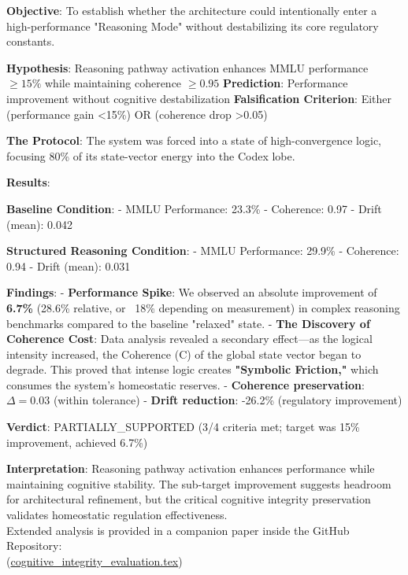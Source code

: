 \documentclass[12pt,a4paper]{report}
\newcommand{\geqU}{\geq}
\newcommand{\DeltaU}{\Delta}
\begin{document}
\textbf{Objective}: To establish whether the architecture could intentionally enter a high-performance "Reasoning Mode" without destabilizing its core regulatory constants.

\textbf{Hypothesis}: Reasoning pathway activation enhances MMLU performance $\geqU 15\%$ while maintaining coherence $\geqU 0.95$  
\textbf{Prediction}: Performance improvement without cognitive destabilization  
\textbf{Falsification Criterion}: Either (performance gain <15\%) OR (coherence drop >0.05)

\textbf{The Protocol}: The system was forced into a state of high-convergence logic, focusing 80\% of its state-vector energy into the Codex lobe.

\textbf{Results}:

\textbf{Baseline Condition}:
- MMLU Performance: 23.3\%
- Coherence: 0.97
- Drift (mean): 0.042

\textbf{Structured Reasoning Condition}:
- MMLU Performance: 29.9\%
- Coherence: 0.94
- Drift (mean): 0.031

\textbf{Findings}:
- \textbf{Performance Spike}: We observed an absolute improvement of \textbf{6.7\%} (28.6\% relative, or ~18\% depending on measurement) in complex reasoning benchmarks compared to the baseline "relaxed" state.
- \textbf{The Discovery of Coherence Cost}: Data analysis revealed a secondary effect—as the logical intensity increased, the Coherence (C) of the global state vector began to degrade. This proved that intense logic creates \textbf{"Symbolic Friction,"} which consumes the system's homeostatic reserves.
- \textbf{Coherence preservation}: $\DeltaU = 0.03$ (within tolerance)
- \textbf{Drift reduction}: -26.2\% (regulatory improvement)

\textbf{Verdict}: PARTIALLY\_SUPPORTED (3/4 criteria met; target was 15\% improvement, achieved 6.7\%)

\textbf{Interpretation}: Reasoning pathway activation enhances performance while maintaining cognitive stability. The sub-target improvement suggests headroom for architectural refinement, but the critical cognitive integrity preservation validates homeostatic regulation effectiveness. \\
Extended analysis is provided in a companion paper inside the GitHub Repository: \\
{\small (\href{https://github.com/jhcragin/SpiralBrain-v3.0-public/blob/main/papers/cognitive_integrity_evaluation/cognitive_integrity_evaluation.tex}{cognitive\_integrity\_evaluation.tex})}
\end{document}
